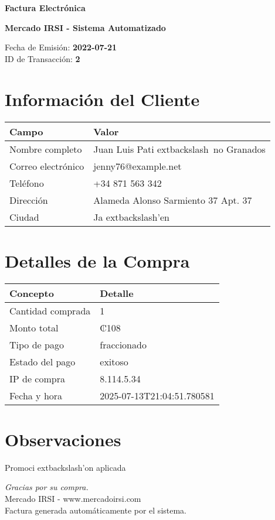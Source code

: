 \documentclass[10pt]{article}
\begin{document}
\begin{center}
    \Huge \textbf{Factura Electrónica}

    \vspace{0.3cm}
    \large \textbf{Mercado IRSI - Sistema Automatizado}

    \vspace{0.5cm}
    \normalsize Fecha de Emisión: \textbf{2022-07-21} \\
    ID de Transacción: \textbf{2} \\
\end{center}

\vspace{1cm}

\section*{Información del Cliente}
\begin{tabularx}{\textwidth}{>{\raggedright\arraybackslash}p{4cm} X}
\rowcolor{lightgray}
\textbf{Campo} & \textbf{Valor} \\
\hline
Nombre completo & Juan Luis Pati	extbackslash{}~{n}o Granados \\
Correo electrónico & jenny76@example.net \\
Teléfono & +34 871 563 342 \\
Dirección & Alameda Alonso Sarmiento 37 Apt. 37  \\
Ciudad & Ja	extbackslash{}'{e}n \\
\end{tabularx}

\vspace{0.8cm}

\section*{Detalles de la Compra}
\begin{tabularx}{\textwidth}{>{\raggedright\arraybackslash}p{6cm} X}
\rowcolor{lightgray}
\textbf{Concepto} & \textbf{Detalle} \\
\hline
Cantidad comprada & 1 \\
Monto total & ₡108 \\
Tipo de pago & fraccionado \\
Estado del pago & exitoso \\
IP de compra & 8.114.5.34 \\
Fecha y hora & 2025-07-13T21:04:51.780581 \\
\end{tabularx}

\vspace{1.5cm}

\section*{Observaciones}
Promoci	extbackslash{}'{o}n aplicada

\vfill

\begin{center}
    \textit{Gracias por su compra.} \\
    Mercado IRSI - www.mercadoirsi.com \\
    Factura generada automáticamente por el sistema.
\end{center}
\end{document}
